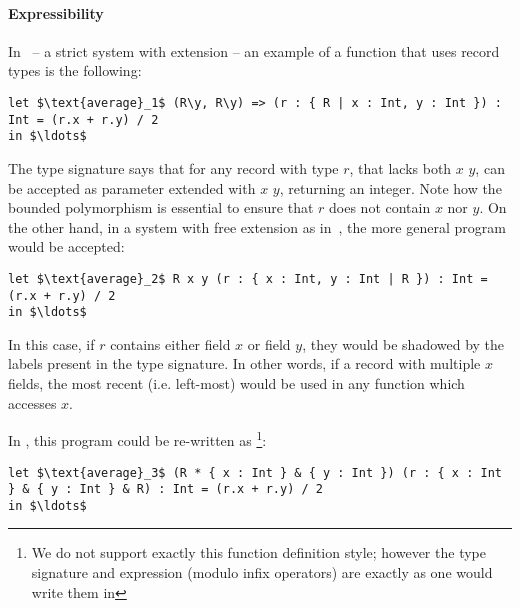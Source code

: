 \paragraph{Expressibility}
In~\cite{jones99lightweight} -- a strict system with extension -- an example of a function that uses 
record types is the following:
\begin{lstlisting}[mathescape=true]
let $\text{average}_1$ (R\y, R\y) => (r : { R | x : Int, y : Int }) : Int = (r.x + r.y) / 2 
in $\ldots$ 
\end{lstlisting}

The type signature says that for any record with type $r$, that lacks both $x$ $y$, can be accepted
as parameter extended with $x$ $y$, returning an integer.
Note how the bounded polymorphism is essential to ensure that $r$ does not contain $x$ nor $y$.
On the other hand, in a system with free extension as in~\cite{leijen2005extensible}, 
the more general program would be accepted:
\begin{lstlisting}[mathescape=true]
let $\text{average}_2$ R x y (r : { x : Int, y : Int | R }) : Int = (r.x + r.y) / 2 
in $\ldots$ 
\end{lstlisting}

In this case, if $r$ contains either field $x$ or field $y$, they would be shadowed by the labels 
present in the type signature.
In other words, if a record with multiple $x$ fields, the most recent (i.e. left-most) would be used 
in any function which accesses $x$.

In \name, this program could be re-written as
\footnote{We do not support exactly this function definition style; 
however the type signature and expression (modulo infix operators) are exactly as one would write them
in \name}:
\begin{lstlisting}[mathescape=true]
let $\text{average}_3$ (R * { x : Int } & { y : Int }) (r : { x : Int } & { y : Int } & R) : Int = (r.x + r.y) / 2 
in $\ldots$ 
\end{lstlisting}

